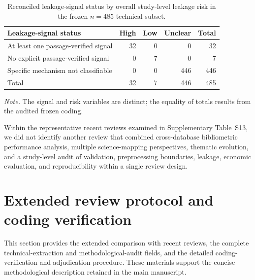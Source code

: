 \documentclass[12pt]{article}
\numberwithin{equation}{section}
\begin{document}
\FloatBarrier   



\begin{table}[!htbp]
\centering
\caption{Reconciled leakage-signal status by overall study-level leakage risk in the frozen $n=485$ technical subset.}
\label{tab:supp-leakage-signal-risk-crosswalk}
\small
\setlength{\tabcolsep}{4pt}
\renewcommand{\arraystretch}{1.12}
\begin{tabular}{lrrrr}
\toprule
Leakage-signal status & High & Low & Unclear & Total \\
\midrule
At least one passage-verified signal & 32 & 0 & 0 & 32 \\
No explicit passage-verified signal & 0 & 7 & 0 & 7 \\
Specific mechanism not classifiable & 0 & 0 & 446 & 446 \\
Total & 32 & 7 & 446 & 485 \\
\bottomrule
\end{tabular}

\vspace{1mm}
\begin{minipage}{0.97\linewidth}
\footnotesize
\textit{Note.} The signal and risk variables are distinct; the equality of totals results from the audited frozen coding.
\end{minipage}
\end{table}


Within the representative recent reviews examined in
Supplementary Table~S13, we did not identify another review that combined
cross-database bibliometric performance analysis, multiple science-mapping
perspectives, thematic evolution, and a study-level audit of validation,
preprocessing boundaries, leakage, economic evaluation, and reproducibility
within a single review design.

\section{Extended review protocol and coding verification}
\label{sec:supp-review-protocol-and-coding-verification}

\setcounter{table}{12}

This section provides the extended comparison with recent reviews,
the complete technical-extraction and methodological-audit fields,
and the detailed coding-verification and adjudication procedure.
These materials support the concise methodological description
retained in the main manuscript.
\end{document}
